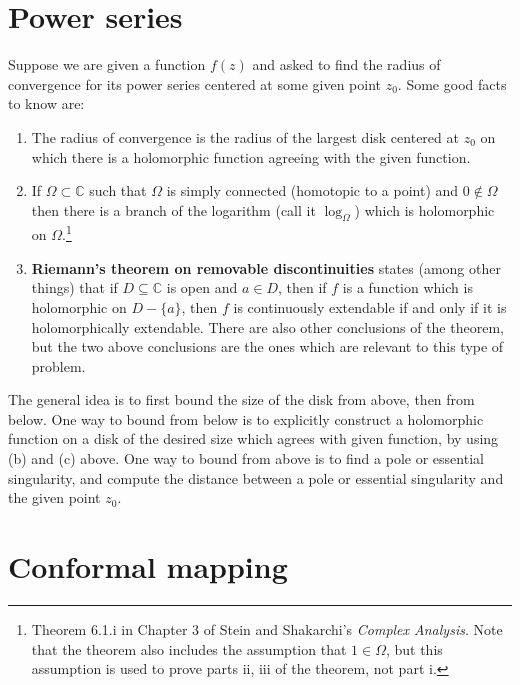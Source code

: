 \documentclass[10pt]{article}
\begin{document}
\section{Power series}
Suppose we are given a function $f(z)$ and asked to find the radius of convergence for its power series centered at some given point $z_0$. Some good facts to know are:
\begin{enumerate}[label = \alph*)]
\item The radius of convergence is the radius of the largest disk centered at $z_0$ on which there is a holomorphic function agreeing with the given function.
\item If $\Omega \subset \mathbb{C}$ such that $\Omega$ is simply connected (homotopic to a point) and $0 \not \in \Omega$ then there is a branch of the logarithm (call it $\log_\Omega$) which is holomorphic on $\Omega$.\footnote{Theorem 6.1.i in Chapter 3 of Stein and Shakarchi's \textit{Complex Analysis}. Note that the theorem also includes the assumption that $1 \in \Omega$, but this assumption is used to prove parts ii, iii of the theorem, not part i.}
\item \textbf{Riemann's theorem on removable discontinuities} states (among other things) that if $D \subseteq \mathbb{C}$ is open and $a \in D$, then if $f$ is a function which is holomorphic on $D-\{a\}$, then $f$ is continuously extendable if and only if it is holomorphically extendable. There are also other conclusions of the theorem, but the two above conclusions are the ones which are relevant to this type of problem.
\end{enumerate}

The general idea is to first bound the size of the disk from above, then from below. One way to bound from below is to explicitly construct a holomorphic function on a disk of the desired size which agrees with given function, by using (b) and (c) above.
One way to bound from above is to find a pole or essential singularity, and compute the distance between a pole or essential singularity and the given point $z_0$.


\section{Conformal mapping}
\end{document}
